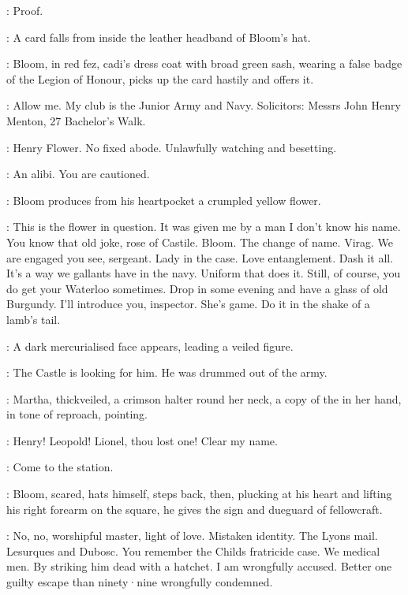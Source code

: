 \FirstWatch:
Proof.

:
A card falls from inside the leather headband of Bloom's hat.

:
Bloom,
in red fez,
cadi's dress coat with broad green sash,
wearing a false badge of the Legion of Honour,
picks up the card hastily and offers it.

\Bloom:
Allow me.
My club is the Junior Army and Navy.
Solicitors:
Messrs John Henry Menton,
27 Bachelor's Walk.

\FirstWatch:
Henry Flower.
No fixed abode.
Unlawfully watching and besetting.

\SecondWatch[2]:
An alibi.
You are cautioned.

:
Bloom produces from his heartpocket a crumpled yellow flower.

\Bloom:
This is the flower in question.
It was given me by a man I don't know his name.
You know that old joke,
rose of Castile.
Bloom.
The change of name.
Virag.
We are engaged you see,
sergeant.
Lady in the case.
Love entanglement.
Dash it all.
It's a way we gallants have in the navy.
Uniform that does it.
Still,
of course,
you do get your Waterloo sometimes.
Drop in some evening and have a glass of old Burgundy.
I'll introduce you,
inspector.
She's game.
Do it in the shake of a lamb's tail.

:
A dark mercurialised face appears,
leading a veiled figure.

\DarkMercury:
The Castle is looking for him.
He was drummed out of the army.

:
Martha,
thickveiled,
a crimson halter round her neck,
a copy of the 
in her hand,
in tone of reproach,
pointing.

\Martha:
Henry!
Leopold!
Lionel,
thou lost one!
Clear my name.

\FirstWatch[1]:
Come to the station.

:
Bloom,
scared,
hats himself,
steps back,
then,
plucking at his heart and lifting his right forearm on the square,
he gives the sign and dueguard of fellowcraft.

\Bloom:
No,
no,
worshipful master,
light of love.
Mistaken identity.
The Lyons mail.
Lesurques and Dubosc.
You remember the Childs fratricide case.
We medical men.
By striking him dead with a hatchet.
I am wrongfully accused.
Better one guilty escape than ninety·nine wrongfully condemned.

